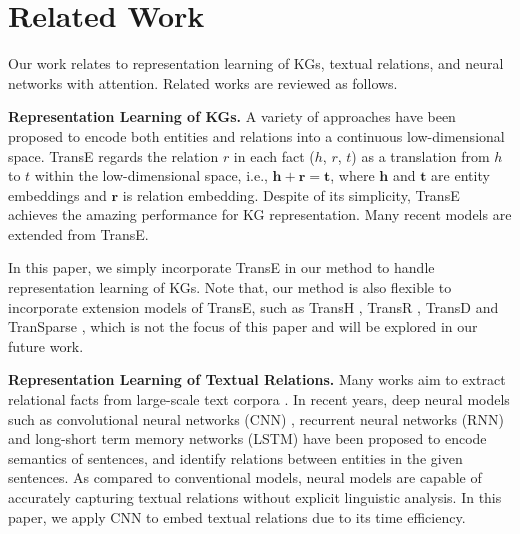 \documentclass[11pt,a4paper]{article}
\begin{document}
\section{Related Work}
\label{sec:related}
Our work relates to representation learning of KGs, textual relations, and neural networks with attention. Related works are reviewed as follows.

\textbf{Representation Learning of KGs.} A variety of approaches have been proposed to encode both entities and relations into a continuous low-dimensional space. TransE \cite{bordes2013translating} regards the relation $r$ in each fact ($h$, $r$, $t$) as a translation from $h$ to $t$ within the low-dimensional space, i.e., $\textbf{h} + \textbf{r} = \textbf{t}$, where $\textbf{h}$ and $\textbf{t}$ are entity embeddings and $\textbf{r}$ is relation embedding. Despite of its simplicity, TransE achieves the amazing performance for KG representation. Many recent models are extended from TransE.

In this paper, we simply incorporate TransE in our method to handle representation learning of KGs. Note that, our method is also flexible to incorporate extension models of TransE, such as TransH \cite{wang2014transh}, TransR \cite{lin2015learning}, TransD \cite{ji2015knowledge} and TranSparse \cite{ji2016knowledge}, which is not the focus of this paper and will be explored in our future work.


\textbf{Representation Learning of Textual Relations.} Many works aim to extract relational facts from large-scale text corpora \cite{mintz2009distant,riedel2010modeling}. In recent years, deep neural models such as convolutional neural networks (CNN) \cite{zeng2014relation,zeng2015distant,lin2016neural}, recurrent neural networks (RNN) \cite{zhang2015relation} and long-short term memory networks (LSTM) \cite{xu2015classifying,miwa2016end} have been proposed to encode semantics of sentences, and identify relations between entities in the given sentences. As compared to conventional models, neural models are capable of accurately capturing textual relations without explicit linguistic analysis. In this paper, we apply CNN to embed textual relations due to its time efficiency.
\end{document}
